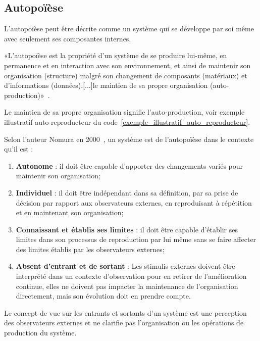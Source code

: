 \subsection{Autopoïèse}

L'autopoïèse peut être décrite comme un système qui se développe par soi même avec seulement ses composantes internes.

«L'autopoïèse est la propriété d'un système de se produire lui-même, en permanence et en interaction avec son environnement, et ainsi de maintenir son organisation (structure) malgré son changement de composants (matériaux) et d'informations (données).[...]le maintien de sa propre organisation (auto-production)»~\cite{wiki_autopoiesis_2022}.

Le maintien de sa propre organisation signifie l'auto-production, voir exemple illustratif auto-reproducteur du code~\ref{exemple_illustratif_auto_reproducteur}.

Selon l'auteur Nomura en 2000~\cite{tatsuya_computational_autopoiesis_2000}, un système est de l'autopoïèse dans le contexte qu'il est : 
\begin{enumerate}
    \item \textbf{Autonome} : il doit être capable d'apporter des changements variés pour maintenir son organisation;
    \item \textbf{Individuel} : il doit être indépendant dans sa définition, par sa prise de décision par rapport aux observateurs externes, en reproduisant à répétition et en maintenant son organisation;
    \item \textbf{Connaissant et établis ses limites} : il doit être capable d'établir ses limites dans son processus de reproduction par lui même sans se faire affecter des limites établis par les observateurs externes;
    \item \textbf{Absent d'entrant et de sortant} : Les stimulis externes doivent être interprété dans un contexte d'observation pour en retirer de l'amélioration continue, elles ne doivent pas impacter la maintenance de l'organisation directement, mais son évolution doit en prendre compte.
\end{enumerate}

Le concept de vue sur les entrants et sortants d'un système est une perception des observateurs externes et ne clarifie pas l'organisation ou les opérations de production du système. 


